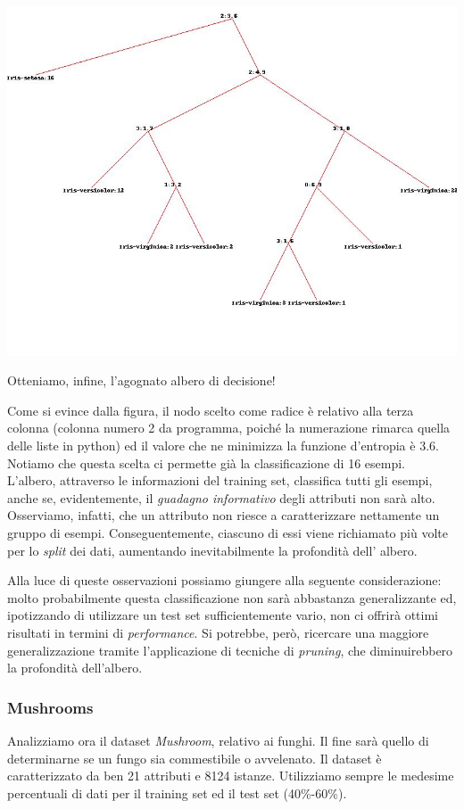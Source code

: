 			\includegraphics[scale=0.55]{iris.jpg}
		
			Otteniamo, infine, l'agognato albero di decisione!\par
			Come si evince dalla figura, il nodo scelto come radice è relativo alla terza colonna (colonna numero 2 da programma, poiché la numerazione rimarca quella delle liste in python) ed il valore che ne minimizza la funzione d'entropia è 3.6. Notiamo che questa scelta ci permette già la classificazione di 16 esempi.
			L'albero, attraverso le informazioni del training set, classifica tutti gli esempi, anche se, evidentemente, il \emph{guadagno informativo} degli attributi non sarà alto. Osserviamo, infatti, che un attributo non riesce a caratterizzare nettamente un gruppo di esempi. Conseguentemente, ciascuno di essi viene richiamato più volte per lo \emph{split} dei dati, aumentando inevitabilmente la profondità dell' albero.\par
			Alla luce di queste osservazioni possiamo giungere alla seguente considerazione: molto probabilmente questa classificazione non sarà abbastanza generalizzante ed, ipotizzando di utilizzare un test set sufficientemente vario, non ci offrirà ottimi risultati in termini di \emph{performance}. Si potrebbe, però, ricercare una maggiore generalizzazione tramite l'applicazione di tecniche di \emph{pruning}, che diminuirebbero la profondità dell'albero.\par
		\subsubsection{Mushrooms} 
			Analizziamo ora il dataset \emph{Mushroom}, relativo ai funghi. Il fine sarà quello di determinarne se un fungo sia commestibile o avvelenato. Il dataset è caratterizzato da ben 21 attributi e 8124 istanze. Utilizziamo sempre le medesime percentuali di dati per il training set ed il test set (40\%-60\%).
			
